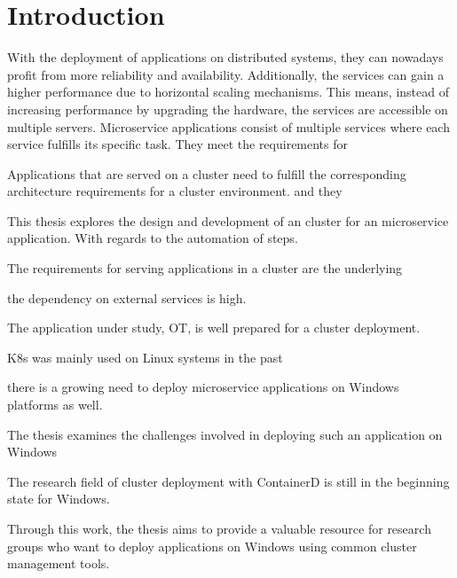 


\chapter{Introduction} %

\label{chap:introd} %



With the deployment of applications on distributed systems, they can nowadays profit from more reliability and availability. Additionally, the services can gain a higher performance due to horizontal scaling mechanisms. This means, instead of increasing performance by upgrading the hardware, the services are accessible on multiple servers.
Microservice applications consist of multiple services where each service fulfills its specific task. They meet the requirements for 


Applications that are served on a cluster need to fulfill the corresponding architecture requirements for a cluster environment.  and they 

This thesis explores the design and development of an cluster for an microservice application.
With regards to the automation of steps.

The requirements for serving applications in a cluster are the underlying

 the dependency on external services is high. 

The application under study, \acf{OT}, is well prepared for a cluster deployment.

\ac{K8s} was mainly used on Linux systems in the past

 there is a growing need to deploy microservice applications on Windows platforms as well. 

The thesis examines the challenges involved in deploying such an application on Windows


The research field of cluster deployment with ContainerD is still in the beginning state for \ac{Windows}.


Through this work, the thesis aims to provide a valuable resource for research groups who want to deploy applications on Windows using common cluster management tools.


